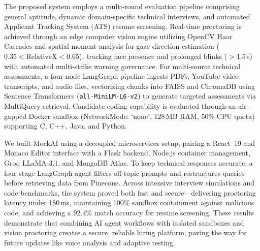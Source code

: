 \documentclass[12pt,a4paper]{report}
\begin{document}
\vspace{0.4cm}
\noindent The proposed system employs a multi-round evaluation pipeline comprising general
aptitude, dynamic domain-specific technical interviews, and automated Applicant Tracking
System (ATS) resume screening. Real-time proctoring is achieved through an edge computer
vision engine utilizing OpenCV Haar Cascades and spatial moment analysis for gaze
direction estimation ($0.35 < \text{RelativeX} < 0.65$), tracking face presence and
prolonged blinks ($>$1.5\,s) with automated multi-strike warning governance. For
multi-source technical assessments, a four-node LangGraph pipeline ingests PDFs,
YouTube video transcripts, and audio files, vectorizing chunks into FAISS and ChromaDB
using Sentence Transformers (\texttt{all-MiniLM-L6-v2}) to generate targeted assessments
via MultiQuery retrieval. Candidate coding capability is evaluated through an air-gapped
Docker sandbox (NetworkMode: `none', 128\,MB RAM, 50\% CPU quota) supporting C, C++,
Java, and Python.

\vspace{0.4cm}
\noindent We built MockAI using a decoupled microservices setup, pairing a React~19 and Monaco
Editor interface with a Flask backend, Node.js container management, Groq LLaMA-3.1,
and MongoDB Atlas. To keep technical responses accurate, a four-stage LangGraph agent
filters off-topic prompts and restructures queries before retrieving data from Pinecone.
Across intensive interview simulations and code benchmarks, the system proved both fast
and secure---delivering proctoring latency under 180\,ms, maintaining 100\% sandbox
containment against malicious code, and achieving a 92.4\% match accuracy for resume
screening. These results demonstrate that combining AI agent workflows with isolated
sandboxes and vision proctoring creates a secure, reliable hiring platform, paving the way
for future updates like voice analysis and adaptive testing.

\clearpage
\renewcommand{\contentsname}{TABLE OF CONTENTS}
\tableofcontents

\clearpage
\renewcommand{\listtablename}{LIST OF TABLES}
\listoftables
{}

\clearpage
\renewcommand{\listfigurename}{LIST OF FIGURES}
\listoffigures
{}
\end{document}
